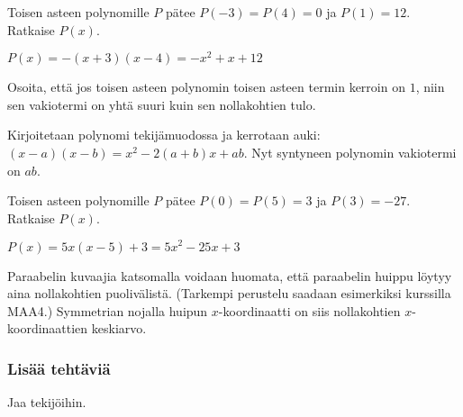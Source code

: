 \begin{tehtavasivu}
\begin{tehtava}
    Toisen asteen polynomille $P$ pätee $P(-3)=P(4)=0$ ja $P(1)=12$. Ratkaise $P(x)$.
    \begin{vastaus}
        $P(x)=-(x+3)(x-4)=-x^2+x+12$
    \end{vastaus}
\end{tehtava}

\begin{tehtava}
    Osoita, että jos toisen asteen polynomin toisen asteen termin kerroin on $1$, niin sen vakiotermi on yhtä suuri kuin sen nollakohtien tulo.
    \begin{vastaus}
        Kirjoitetaan polynomi tekijämuodossa ja kerrotaan auki: $(x-a)(x-b)=x^2-2(a+b)x+ab$. Nyt syntyneen polynomin vakiotermi on $ab$.
    \end{vastaus}
\end{tehtava}

\begin{tehtava}
    Toisen asteen polynomille $P$ pätee $P(0)=P(5)=3$ ja $P(3)=-27$. Ratkaise $P(x)$.
    \begin{vastaus}
        $P(x)=5x(x-5)+3=5x^2-25x+3$
    \end{vastaus}
\end{tehtava}

\begin{tehtava}
    Paraabelin kuvaajia katsomalla voidaan huomata, että paraabelin huippu löytyy aina nollakohtien puolivälistä. (Tarkempi perustelu saadaan esimerkiksi kurssilla MAA4.) Symmetrian nojalla huipun $x$-koordinaatti on siis nollakohtien $x$-koordinaattien keskiarvo.
    \begin{vastaus}
        \alakohdat{
            § $x=\frac14$ ja $y=5\frac58$.
            § $x=-\frac{b}{2a}$ %
        }
    \end{vastaus}
\end{tehtava}

\subsubsection*{Lisää tehtäviä}

\begin{tehtava}
    Jaa tekijöihin.
    \begin{vastaus}
    \end{vastaus}
\end{tehtava}


\end{tehtavasivu}

